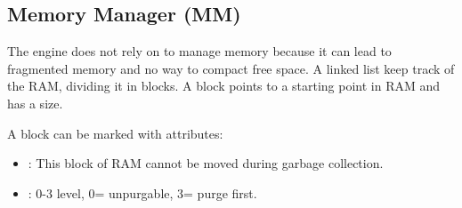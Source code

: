 \documentclass[book.tex]{subfiles}
\begin{document}
\subsection{Memory Manager (MM)}
The engine does not rely on  to manage memory because it can lead to fragmented memory and no way to compact free space. A linked list keep track of the RAM, dividing it in blocks. A block points to a starting point in RAM and has a size.\\
 \par

 \par
A block can be marked with attributes:
\begin{itemize}
\item {} : This block of RAM cannot be moved during garbage collection.
\item {} : 0-3 level, 0= unpurgable, 3= purge first.
\end{itemize}
\end{document}
